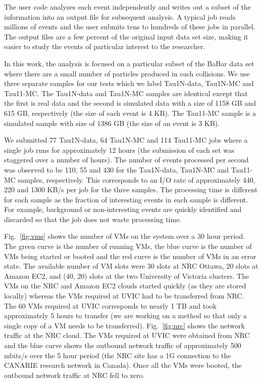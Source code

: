 \documentclass[10pt, conference, compsocconf]{IEEEtran}
\begin{document}
The user code analyzes each event independently and writes out a subset 
of the information into an output file for subsequent analysis.
A typical job reads millions of events and the user
submits tens to hundreds of these jobs in parallel.
The output files are a few percent of the original input data set
size, making it easier to study the events of particular interest to the 
researcher.

In this work, the analysis is focused on a particular subset of the BaBar data
set where there are a small number of particles produced in each collisions.
We use three separate samples for our tests which we label Tau1N-data,
Tau1N-MC and Tau11-MC.
The Tau1N-data and Tau1N-MC samples are identical except that the first
is real data and the second is simulated data with a size of 1158 GB
and 615 GB, respectively (the size of each event is 4 KB).
The Tau11-MC sample is a simulated sample with size of 1386 GB
(the size of an event is 3 KB).

We submitted 77 Tau1N-data, 64 Tau1N-MC and 114 Tau11-MC jobs where
a single job runs for approximately 12 hours (the submission of each set
was staggered over a number of hours). 
The number of events processed per second was observed to be 110, 
55 and 430 for the Tau1N-data, Tau1N-MC and Tau11-MC samples, respectively.
This corresponds to an I/O rate of approximately 440, 220 and 
1300 KB/s per job for the three samples.
The processing time is different for each sample as the fraction of interesting
events in each sample is different.
For example, background or non-interesting events are quickly identified and 
discarded so that the job does not waste processing time.

Fig.~\ref{fig:vms} shows the number of VMs on the system over a 30 hour period.
The green curve is the number of running VMs, the blue curve
is the number of VMs being started or booted and the red curve is the number
of VMs in an error state.
The available number of VM slots were 30 slots at NRC Ottawa, 20 slots
at Amazon EC2, and (40, 20) slots at the two University of Victoria clusters.
The VMs on the NRC and Amazon EC2 clouds started quickly (as they are stored 
locally) whereas the VMs required at UVIC had to be transferred from NRC.
The 60 VMs required at UVIC corresponds to nearly 1 TB and took approximately 
5 hours to transfer (we are working on a method so that only a single copy 
of a VM needs to be transferred).
Fig.~\ref{fig:nrc} shows the network traffic at the NRC cloud.
The VMs required at UVIC were obtained from NRC and the blue curve shows
the outbound network traffic of approximately 500 mbits/s over the
5 hour period (the NRC site has a 1G connection to the CANARIE research 
network in Canada).
Once all the VMs were booted, the outbound network traffic at NRC fell to zero.
\end{document}
